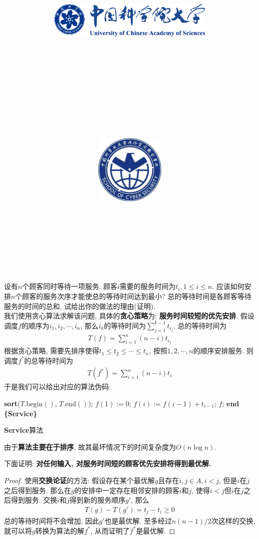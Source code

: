 \documentclass{article}
\title{
	\includegraphics[width=0.6\textwidth]{images/title/ucas_logo 1.pdf}\\
    \vspace{1in}
    \textmd{\textbf{\hmwkClass}}\\
	\textmd{\Large{\textbf{\hmwkClassID}}}\\
    \textmd{\textbf{\hmwkTitle}}\\
    \normalsize\vspace{0.1in}\large{\hmwkCompleteTime }\\
    \vspace{0.1in}\large{\textit{\hmwkClassInstructor\ }}\\
    \vspace{1in}
	\includegraphics[width=0.25\textwidth]{images/title/Cyber.jpg}\\
	\vspace{1in}
}
\author{
	\hmwkAuthorName \\ 
	\hmwkAuthorStuID \\
	\hmwkAuthorInst \\
	\hmwkAuthorzhuanye \\
	\hmwkAuthorfangxiang
	}
\date{}
\begin{document}
\maketitle


%
%
%
%
%


\pagebreak

\begin{homeworkProblem}
	设有$n$个顾客同时等待一项服务. 顾客$i$需要的服务时间为$t_i, 1 \leq i\leq n$. 应该如何安排$n$个顾客的服务次序才能使总的等待时间达到最小? 总的等待时间是各顾客等待服务的时间的总和. 试给出你的做法的理由(证明).
	\\

	\solution 我们使用贪心算法求解该问题, 具体的\textbf{贪心策略}为: \textbf{服务时间较短的优先安排}. 假设调度$f$的顺序为$i_1,i_2,\cdots, i_n$, 那么$i_k$的等待时间为$\displaystyle \sum_{j=1}^{k-1}{t_{i_j}}$, 总的等待时间为
	\begin{align}
		T\left( f \right) =\sum_{i=1}^n{\left( n-i \right) t_{i_j}}
	\end{align}
	根据贪心策略, 需要先排序使得$t_1\leq t_2 \leq \cdots \leq t_n$, 按照$1,2,\cdots,n$的顺序安排服务. 则调度$f^{\ast}$的总等待时间为
	\begin{align}
		T\left( f^{\ast} \right) =\sum_{i=1}^n{\left( n-i \right) t_i}
	\end{align}
	于是我们可以给出对应的算法伪码:
	\begin{algorithm}[H]
		\begin{algorithmic}[1]
		\State \textbf{sort}($T.\text{begin}()$, $T.\text{end}()$); 
		\State $f(1):=0$;
			\State $f(i):=f(i-1)+t_{i-1}$;
		\EndFor
		\State \Return $f$;
		\State \textbf{end \{Service\}}
		\end{algorithmic}
		\caption{\textbf{Service}算法}
		\label{alg:Service}
	\end{algorithm}
	由于\textbf{算法主要在于排序}, 故其最坏情况下的时间复杂度为$O(n\log n)$. 
	
	下面证明: \textbf{对任何输入, 对服务时间短的顾客优先安排将得到最优解.}
	\begin{proof}
		使用\textbf{交换论证}的方法: 假设存在某个最优解$g$且存在$i,j\in A,i<j$, 但是$i$在$j$之后得到服务. 那么在$g$的安排中一定存在相邻安排的顾客$i$和$j$, 使得$i<j$但$i$在$j$之后得到服务. 交换$i$和$j$得到新的服务顺序$g'$, 那么
		\begin{align}
			T\left( g \right) -T\left( g' \right) =t_j-t_i\ge 0
		\end{align}
		总的等待时间将不会增加, 因此$g'$也是最优解. 至多经过$n(n-1)/2$次这样的交换, 就可以将$g$转换为算法的解$f^{\ast}$, 从而证明了$f^{\ast}$是最优解.
	\end{proof}
\end{homeworkProblem}
\end{document}
